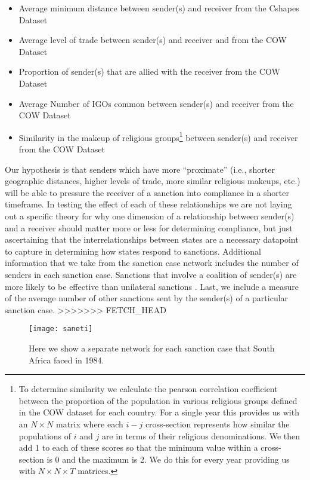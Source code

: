 \begin{itemize}
	\item Average minimum distance between sender(s) and receiver from the Cshapes Dataset \citep{weidmann2010geography}
	\item Average level of trade between sender(s) and receiver and from the COW Dataset \citep{barbieri2009trading}
	\item Proportion of sender(s) that are allied with the receiver from the COW Dataset \citep{gibler2009international}
	\item Average Number of IGOs common between sender(s) and receiver from the COW Dataset \citep{pevehouse2004correlates}
	\item Similarity in the makeup of religious groups\footnote{To determine similarity we calculate the pearson correlation coefficient between the proportion of the population in various religious groups defined in the COW dataset for each country. For a single year this provides us with an $N \times N$ matrix where each $i-j$ cross-section represents how similar the populations of $i$ and $j$ are in terms of their religious denominations. We then add 1 to each of these scores so that the minimum value within a cross-section is 0 and the maximum is 2. We do this for every year providing us with $N \times N \times T$ matrices.} between sender(s) and receiver from the COW Dataset \citep{maoz2013world}
\end{itemize}

Our hypothesis is that senders which have more ``proximate'' (i.e., shorter geographic distances, higher levels of trade, more similar religious makeups, etc.) will be able to pressure the receiver of a sanction into compliance in a shorter timeframe. In testing the effect of each of these relationships we are not laying out a specific theory for why one dimension of a relationship between sender(s) and a receiver should matter more or less for determining compliance, but just ascertaining that the interrelationships between states are a necessary datapoint to capture in determining how states respond to sanctions. Additional information that we take from the sanction case network includes the number of senders in each sanction case. Sanctions that involve a coalition of sender(s) are more likely to be effective than unilateral sanctions \citep{morgan2009threat}. Last, we include a measure of the average number of other sanctions sent by the sender(s) of a particular sanction case. 
>>>>>>> FETCH_HEAD

\begin{figure}[ht]
	\centering
	\texttt{[image: saneti]}
	\caption{Here we show a separate network for each sanction case that South Africa faced in 1984.}
	\label{fig:saneti}
\end{figure}
\FloatBarrier

